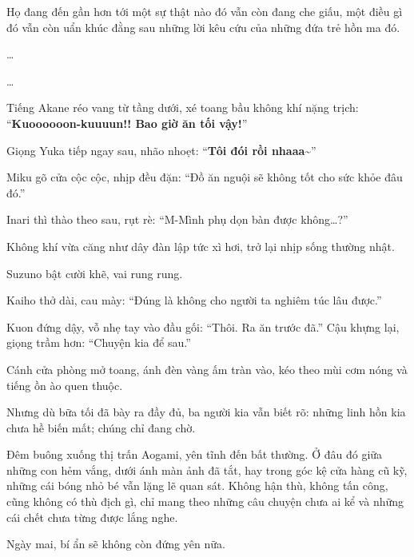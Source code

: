 \documentclass[../main.tex]{subfiles}
\begin{document}
Họ đang đến gần hơn tới một sự thật nào đó vẫn còn đang che giấu, một điều gì đó vẫn còn uẩn khúc đằng sau những lời kêu cứu của những đứa trẻ hồn ma đó.

\dots

\dots

Tiếng Akane réo vang từ tầng dưới, xé toang bầu không khí nặng trịch: ``\textbf{Kuoooooon-kuuuun!! Bao giờ ăn tối vậy!}''

Giọng Yuka tiếp ngay sau, nhão nhoẹt: ``\textbf{Tôi đói rồi nhaaa\~{}}''

Miku gõ cửa cộc cộc, nhịp đều đặn: ``Đồ ăn nguội sẽ không tốt cho sức khỏe đâu đó.''

Inari thì thào theo sau, rụt rè: ``M-Mình phụ dọn bàn được không\dots?''

Không khí vừa căng như dây đàn lập tức xì hơi, trở lại nhịp sống thường nhật.

Suzuno bật cười khẽ, vai rung rung.

Kaiho thở dài, cau mày: ``Đúng là không cho người ta nghiêm túc lâu được.''

Kuon đứng dậy, vỗ nhẹ tay vào đầu gối: ``Thôi. Ra ăn trước đã.'' Cậu khựng lại, giọng trầm hơn: ``Chuyện kia để sau.''

Cánh cửa phòng mở toang, ánh đèn vàng ấm tràn vào, kéo theo mùi cơm nóng và tiếng ồn ào quen thuộc.

Nhưng dù bữa tối đã bày ra đầy đủ, ba người kia vẫn biết rõ: những linh hồn kia chưa hề biến mất; chúng chỉ đang chờ.

Đêm buông xuống thị trấn Aogami, yên tĩnh đến bất thường. Ở đâu đó giữa những con hẻm vắng, dưới ánh màn ảnh đã tắt, hay trong góc kệ cửa hàng cũ kỹ, những cái bóng nhỏ bé vẫn lặng lẽ quan sát. Không hận thù, không tấn công, cũng không có thù địch gì, chỉ mang theo những câu chuyện chưa ai kể và những cái chết chưa từng được lắng nghe.

Ngày mai, bí ẩn sẽ không còn đứng yên nữa.
\end{document}
